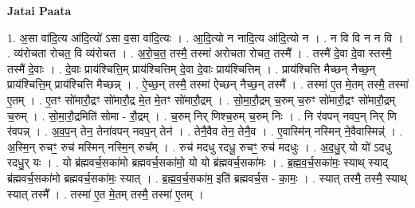 \documentclass[17pt]{extarticle}
\begin{document}
\textbf{Jatai Paata} \newline

1. अ॒सा वा॑दि॒त्य आ॑दि॒त्यो॑ ऽसा व॒सा वा॑दि॒त्यः । . आ॒दि॒त्यो न नादि॒त्य आ॑दि॒त्यो न । . न वि वि न न वि । . व्य॑रोचता रोचत॒ वि व्य॑रोचत । . अ॒रो॒च॒त॒ तस्मै॒ तस्मा॑ अरोचता रोचत॒ तस्मै᳚ । . तस्मै॑ दे॒वा दे॒वा स्तस्मै॒ तस्मै॑ दे॒वाः । . दे॒वाः प्राय॑श्चित्ति॒म् प्राय॑श्चित्तिम् दे॒वा दे॒वाः प्राय॑श्चित्तिम् । . प्राय॑श्चित्ति मैच्छन् नैच्छ॒न् प्राय॑श्चित्ति॒म् प्राय॑श्चित्ति मैच्छन्न् । . ऐ॒च्छ॒न् तस्मै॒ तस्मा॑ ऐच्छन् नैच्छ॒न् तस्मै᳚ । . तस्मा॑ ए॒त मे॒तम् तस्मै॒ तस्मा॑ ए॒तम् । . ए॒तꣳ सो॑मारौ॒द्रꣳ सो॑मारौ॒द्र मे॒त मे॒तꣳ सो॑मारौ॒द्रम् । . सो॒मा॒रौ॒द्रम् च॒रुम् च॒रुꣳ सो॑मारौ॒द्रꣳ सो॑मारौ॒द्रम् च॒रुम् । . सो॒मा॒रौ॒द्रमिति॑ सोमा - रौ॒द्रम् । . च॒रुम् निर् णिश्च॒रुम् च॒रुम् निः । . नि र॑वपन् नवप॒न् निर् णि र॑वपन्न् । . अ॒व॒प॒न् तेन॒ तेना॑वपन् नवप॒न् तेन॑ । . तेनै॒वैव तेन॒ तेनै॒व । . ए॒वास्मि॑न् नस्मिन् ने॒वैवास्मिन्न्॑ । . अ॒स्मि॒न् रुचꣳ॒॒ रुच॑ मस्मिन् नस्मि॒न् रुच᳚म् । . रुच॑ मदधु रदधू॒ रुचꣳ॒॒ रुच॑ मदधुः । . अ॒द॒धु॒र् यो यो॑ ऽदधु रदधु॒र् यः । . यो ब्र॑ह्मवर्च॒सका॑मो ब्रह्मवर्च॒सका॑मो॒ यो यो ब्र॑ह्मवर्च॒सका॑मः । . ब्र॒ह्म॒व॒र्च॒सका॑मः॒ स्याथ् स्याद् ब्र॑ह्मवर्च॒सका॑मो ब्रह्मवर्च॒सका॑मः॒ स्यात् । . ब्र॒ह्म॒व॒र्च॒सका॑म॒ इति॑ ब्रह्मवर्च॒स - का॒मः॒ । . स्यात् तस्मै॒ तस्मै॒ स्याथ् स्यात् तस्मै᳚ । . तस्मा॑ ए॒त मे॒तम् तस्मै॒ तस्मा॑ ए॒तम् । \newline
\end{document}
